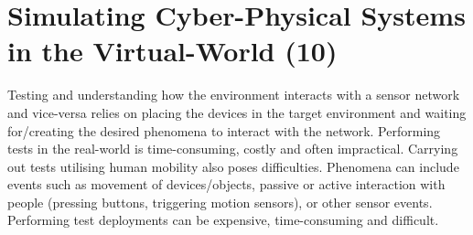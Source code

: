 \chapter{Simulating Cyber-Physical Systems in the Virtual-World (10)}

Testing and understanding how the environment interacts with a sensor network and vice-versa relies on placing the devices in the target environment and waiting for/creating the desired phenomena to interact with the network. Performing tests in the real-world is time-consuming, costly and often impractical. Carrying out tests utilising human mobility also poses difficulties. Phenomena can include events such as movement of devices/objects, passive or active interaction with people (pressing buttons, triggering motion sensors), or other sensor events. Performing test deployments can be expensive, time-consuming and difficult.




